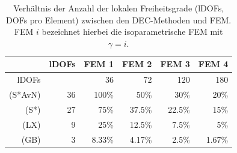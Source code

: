   \begin{table}[htbp]
    \centering
    \begin{tabular}{|r|r|r|r|r|r|}
      \hline
       & lDOFs & FEM 1 & FEM 2 & FEM 3 & FEM 4 \\\hline
       lDOFs & & 36 & 72 & 120 & 180 \\\hline
       (S*AvN) & 36 & 100\% & 50\%   & 30\%   & 20\%  \\\hline
       (S*)    & 27 & 75\%  & 37.5\% & 22.5\% & 15\% \\\hline
       (LX)    & 9  & 25\%  & 12.5\% & 7.5\%  & 5\% \\\hline
       (GB)    & 3  & 8.33\% & 4.17\% & 2.5\% & 1.67\% \\\hline
    \end{tabular}
    \caption[lDOFs Vergleich]{Verhältnis der Anzahl der lokalen Freiheitsgrade (lDOFs, DOFs pro Element) zwischen den DEC-Methoden und FEM.
                              FEM \( i \) bezeichnet hierbei die isoparametrische FEM mit \( \gamma = i \).}
    \label{tabDOFsVergleich}
  \end{table}
  
